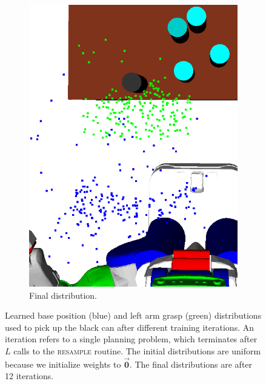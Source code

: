 \begin{figure}
\begin{subfigure}[b]{0.48\linewidth}
    \includegraphics[width=\textwidth]{images/learn12.png}
    \caption{Final distribution.}
  \end{subfigure}
  \caption{Learned base position (blue) and left arm grasp (green) distributions used to
pick up the black can after different training iterations.
An iteration refers to a single planning problem,
which terminates after $L$ calls to the \textsc{resample} routine. The
initial distributions are uniform because we initialize weights to $\vec{\mathbf{0}}$.
The final distributions are after 12 iterations.}
  \label{fig:training}
\end{figure}



